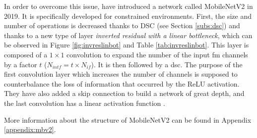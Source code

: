 In order to overcome this issue, \textcite{sandler_mobilenetv2_2018} have introduced a network called MobileNetV2 in 2019. It is specifically developed for constrained environments. First, the size and number of operations is decreased thanks to DSC (see Section \ref{subs:dsc}) and thanks to a new type of layer \textit{inverted residual with a linear bottleneck}, which can be observed in Figure \ref{fig:invreslinbot} and Table \ref{tab:invreslinbot}.
This layer is composed of a $1 \times 1$ convolution to expand the number of the input \acrshort{fm} channels by a factor $t$ ($N_{intf} = t \times N_{if}$). It is then followed by a \acrshort{dsc}. The purpose of the first convolution layer which increases the number of channels is supposed to counterbalance the loss of information that occurred by the ReLU activation. They have also added a skip connection to build a network of great depth, and the last convolution has a linear activation function \cite{sandler_mobilenetv2_2018}.

More information about the structure of MobileNetV2 can be found in Appendix \ref{appendix:mbv2}.
